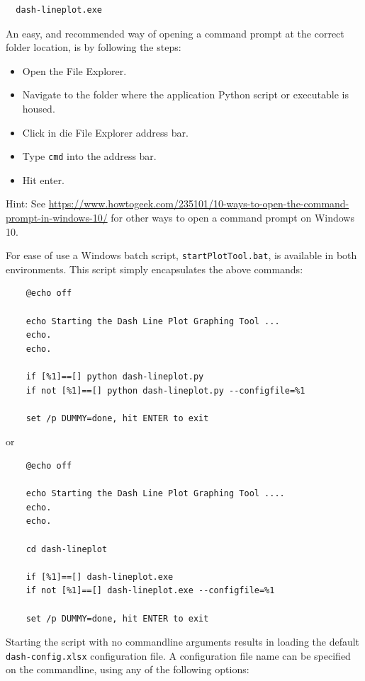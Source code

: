 \footnotesize
\begin{lstlisting}
  dash-lineplot.exe
\end{lstlisting}
\normalsize

An easy, and recommended way of opening a command prompt at the correct folder location, is by following the steps:

\begin{itemize}
  \item Open the File Explorer.
  \item Navigate to the folder where the application Python script or executable is housed.
  \item Click in die File Explorer address bar.
  \item Type \texttt{cmd} into the address bar.
  \item Hit enter.
\end{itemize}

Hint: See 
\footnotesize
\url{https://www.howtogeek.com/235101/10-ways-to-open-the-command-prompt-in-windows-10/} \normalsize
for other ways to open a command prompt on Windows 10.

For ease of use a Windows batch script, \texttt{startPlotTool.bat}, is available in both environments. This script simply encapsulates the above commands:

\footnotesize
\begin{lstlisting}
    @echo off

    echo Starting the Dash Line Plot Graphing Tool ...
    echo.
    echo.

    if [%1]==[] python dash-lineplot.py
    if not [%1]==[] python dash-lineplot.py --configfile=%1

    set /p DUMMY=done, hit ENTER to exit
\end{lstlisting}
\normalsize

or

\footnotesize
\begin{lstlisting}
    @echo off

    echo Starting the Dash Line Plot Graphing Tool ....
    echo.
    echo.

    cd dash-lineplot

    if [%1]==[] dash-lineplot.exe
    if not [%1]==[] dash-lineplot.exe --configfile=%1

    set /p DUMMY=done, hit ENTER to exit
\end{lstlisting}
\normalsize


Starting the script with no commandline arguments results in loading the default \texttt{dash-config.xlsx} configuration file. A configuration file name can be specified on the commandline, using any of the following options:

